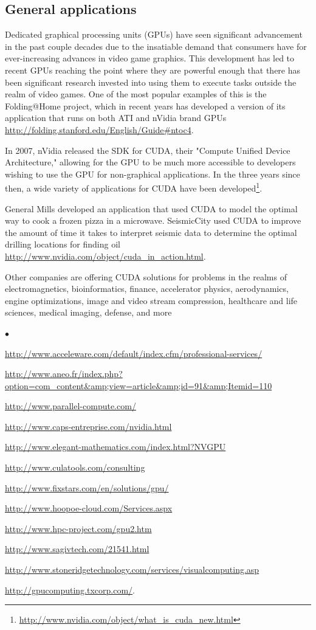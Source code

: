\documentclass[letterpaper,10pt]{article}
\newcommand{\squishlist}{\begin{list}{$\bullet$}
  {\setlength{\itemsep}{0pt}
    \setlength{\parsep}{3pt}
    \setlength{\topsep}{3pt}
    \setlength{\partopsep}{0pt}
    \setlength{\leftmargin}{1.5em}
    \setlength{\labelwidth}{1em}
    \setlength{\labelsep}{0.5em}}}
\newcommand{\squishend}{\end{list}}
\begin{document}
\subsection{General applications}
  
  Dedicated graphical processing units (GPUs) have seen significant advancement
in the past couple decades due to the insatiable demand that consumers have for
ever-increasing advances in video game graphics. This development has led to
recent GPUs reaching the point where they are powerful enough that there has
been significant research invested into using them to execute tasks outside the
realm of video games. One of the most popular examples of this is the
Folding@Home project, which in recent years has developed a version of its
application that runs on both ATI and nVidia brand GPUs
\url{http://folding.stanford.edu/English/Guide#ntoc4}.
  
  In 2007, nVidia released the SDK for CUDA, their "Compute Unified Device
Architecture," allowing for the GPU to be much more accessible to developers
wishing to use the GPU for non-graphical applications. In the three years since
then, a wide variety of applications for CUDA have been developed\footnote{\url{http://www.nvidia.com/object/what\_is\_cuda\_new.html}}.
  
  General Mills developed an application that used CUDA to model the optimal
way to cook a frozen pizza in a microwave. SeismicCity used CUDA to improve the
amount of time it takes to interpret seismic data to determine the optimal
drilling locations for finding oil
\url{http://www.nvidia.com/object/cuda\_in\_action.html}.
  
  Other companies are offering CUDA solutions for problems in the realms of
electromagnetics, bioinformatics, finance, accelerator physics, aerodynamics,
engine optimizations, image and video stream compression, healthcare and life
sciences, medical imaging, defense, and more
\squishlist
\item \url{http://www.acceleware.com/default/index.cfm/professional-services/}
\item \url{http://www.aneo.fr/index.php?option=com\_content&amp;view=article&amp;id=91&amp;Itemid=110}
\item \url{http://www.parallel-compute.com/}
\item \url{http://www.caps-entreprise.com/nvidia.html}
\item \url{http://www.elegant-mathematics.com/index.html?NVGPU}
\item \url{http://www.culatools.com/consulting}
\item \url{http://www.fixstars.com/en/solutions/gpu/}
\item \url{http://www.hoopoe-cloud.com/Services.aspx}
\item \url{http://www.hpc-project.com/gpu2.htm}
\item \url{http://www.sagivtech.com/21541.html}
\item \url{http://www.stoneridgetechnology.com/services/visualcomputing.asp}
\item \url{http://gpucomputing.txcorp.com/}.
\squishend
  
\end{document}
